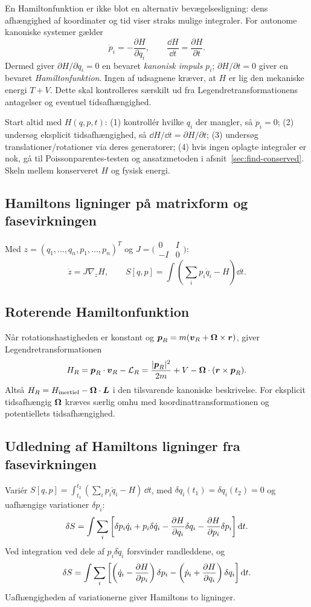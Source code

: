 En Hamiltonfunktion er ikke blot en alternativ bevægelsesligning: dens afhængighed af koordinater og tid viser straks mulige integraler. For autonome kanoniske systemer gælder
\[
\dot p_i=-\frac{\partial H}{\partial q_i},\qquad
\frac{\dd H}{\dd t}=\frac{\partial H}{\partial t}.
\]
Dermed giver $\partial H/\partial q_i=0$ en bevaret \emph{kanonisk impuls} $p_i$; $\partial H/\partial t=0$ giver en bevaret \emph{Hamiltonfunktion}. Ingen af udsagnene kræver, at $H$ er lig den mekaniske energi $T+V$. Dette skal kontrolleres særskilt ud fra Legendretransformationens antagelser og eventuel tidsafhængighed.
\begin{method}Start altid med $H(q,p,t)$: (1) kontrollér hvilke $q_i$ der mangler, så $\dot p_i=0$; (2) undersøg eksplicit tidsafhængighed, så $\dd H/\dd t=\partial H/\partial t$; (3) undersøg translationer/rotationer via deres generatorer; (4) hvis ingen oplagte integraler er nok, gå til Poissonparentes-testen og ansatzmetoden i afsnit~\ref{sec:find-conserved}. Skeln mellem konserveret $H$ og fysisk energi.\end{method}

\subsection{Hamiltons ligninger på matrixform og fasevirkningen}
Med $z=(q_1,\dots,q_n,p_1,\dots,p_n)^T$ og $J=\bigl(\begin{smallmatrix}0&I\\-I&0\end{smallmatrix}\bigr)$:
\[\dot z=J\nabla_z H,\qquad S[q,p]=\int\left(\sum_i p_i\dot q_i-H\right)\dd t.\]


\subsection{Roterende Hamiltonfunktion}
Når rotationshastigheden er konstant og $\boldsymbol{p}_R=m(\boldsymbol{v}_R+\boldsymbol{\Omega}\times\boldsymbol{r})$, giver Legendretransformationen
\[H_R=\boldsymbol{p}_R\cdot\boldsymbol{v}_R-\mathcal L_R=\frac{|\boldsymbol{p}_R|^2}{2m}+V-\boldsymbol{\Omega}\cdot(\boldsymbol{r}\times\boldsymbol{p}_R).\]
Altså $H_R=H_{\rm inertiel}-\boldsymbol{\Omega}\cdot\boldsymbol{L}$ i den tilsvarende kanoniske beskrivelse. For eksplicit tidsafhængig $\boldsymbol{\Omega}$ kræves særlig omhu med koordinattransformationen og potentiellets tidsafhængighed.

\subsection{Udledning af Hamiltons ligninger fra fasevirkningen}
Variér $S[q,p]=\int_{t_1}^{t_2}(\sum_i p_i\dot q_i-H)\,\dd t$, med $\delta q_i(t_1)=\delta q_i(t_2)=0$ og uafhængige variationer $\delta p_i$:
\[\delta S=\int\sum_i\left[\delta p_i\dot q_i+p_i\delta\dot q_i-\frac{\partial H}{\partial q_i}\delta q_i-\frac{\partial H}{\partial p_i}\delta p_i\right]\mathrm d t.\]
Ved integration ved dele af $p_i\delta\dot q_i$ forsvinder randleddene, og
\[\delta S=\int\sum_i\left[\left(\dot q_i-\frac{\partial H}{\partial p_i}\right)\delta p_i-\left(\dot p_i+\frac{\partial H}{\partial q_i}\right)\delta q_i\right]\mathrm d t.\]
Uafhængigheden af variationerne giver Hamiltons to ligninger.


